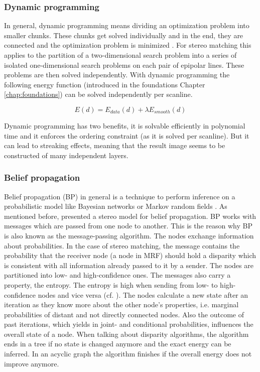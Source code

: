 \subsubsection{Dynamic programming}

In general, dynamic programming means dividing an optimization problem into smaller chunks.
These chunks get solved individually and in the end, they are connected and the optimization problem is minimized \citep{angel1972dynamic, bellman2015applied, cyganek2011introduction}.
For stereo matching this applies to the partition of a two-dimensional search problem into a series of isolated one-dimensional search problems on each pair of epipolar lines.
These problems are then solved independently.
With dynamic programming the following energy function (introduced in the foundations Chapter \ref{chap:foundations}) can be solved independently per scanline.

\begin{equation}
  E(d) = E_{data}(d) + \lambda E_{smooth}(d)
\end{equation}

\noindent Dynamic programming has two benefits, it is solvable efficiently in polynomial time and it enforces the ordering constraint (as it is solved per scanline).
But it can lead to streaking effects, meaning that the result image seems to be constructed of many independent layers.

\subsubsection{Belief propagation}

Belief propagation (BP) in general is a technique to perform inference on a probabilistic model like Bayesian networks or Markov random fields \citep{yedidia2003understanding, tappen2003comparison, cyganek2011introduction}.
As mentioned before, \citeauthor{sun2003stereo} presented a stereo model for belief propagation.
BP works with messages which are passed from one node to another.
This is the reason why BP is also known as the message-passing algorithm.
The nodes exchange information about probabilities.
In the case of stereo matching, the message contains the probability that the receiver node (a node in MRF) should hold a disparity which is consistent with all information already passed to it by a sender.
The nodes are partitioned into low- and high-confidence ones.
The messages also carry a property, the entropy.
The entropy is high when sending from low- to high-confidence nodes and vice versa (cf. \citep{yedidia2003understanding, tappen2003comparison, cyganek2011introduction}).
The nodes calculate a new state after an iteration as they know more about the other node's properties, i.e. marginal probabilities of distant and not directly connected nodes.
Also the outcome of past iterations, which yields in joint- and conditional probabilities, influences the overall state of a node.
When talking about disparity algorithms, the algorithm ends in a tree if no state is changed anymore and the exact energy can be inferred.
In an acyclic graph the algorithm finishes if the overall energy does not improve anymore.

